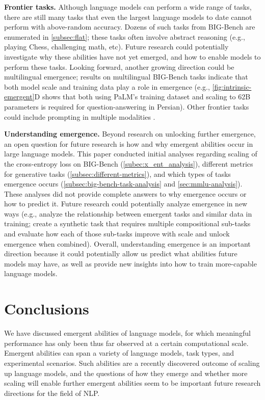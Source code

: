 \documentclass[10pt]{article} %
\begin{document}
\vspace{1mm}
\noindent
\textbf{Frontier tasks.}
Although language models can perform a wide range of tasks, there are still many tasks that even the largest language models to date cannot perform with above-random accuracy.
Dozens of such tasks from BIG-Bench are enumerated in \cref{subsec:flat}; these tasks often involve abstract reasoning (e.g., playing Chess, challenging math, etc). 
Future research could potentially investigate why these abilities have not yet emerged, and how to enable models to perform these tasks.
Looking forward, another growing direction could be multilingual emergence; results on  multilingual BIG-Bench tasks indicate that both model scale and training data play a role in emergence (e.g., \cref{fig:intrinsic-emergent}D shows that both using PaLM's training dataset and scaling to 62B parameters is required for question-answering in Persian).
Other frontier tasks could include prompting in multiple modalities \citep{alayrac2022flamingo,ramesh2022hierarchical}.

\vspace{1mm}
\noindent
\textbf{Understanding emergence.}
Beyond research on unlocking further emergence, an open question for future research is how and why emergent abilities occur in large language models.
This paper conducted initial analyses regarding scaling of the cross-entropy loss on BIG-Bench (\cref{subec:x_ent_analysis}), different metrics for generative tasks (\cref{subsec:different-metrics}), and which types of tasks emergence occurs (\cref{subsec:big-bench-task-analysis} and \cref{sec:mmlu-analysis}).
These analyses did not provide complete answers to why emergence occurs or how to predict it.
Future research could potentially analyze emergence in new ways (e.g., analyze the relationship between emergent tasks and similar data in training; create a synthetic task that requires multiple compositional sub-tasks and evaluate how each of those sub-tasks improve with scale and unlock emergence when combined).
Overall, understanding emergence is an important direction because it could potentially allow us predict what abilities future models may have, as well as provide new insights into how to train more-capable language models.

\section{Conclusions}
We have discussed emergent abilities of language models, for which meaningful performance has only been thus far observed at a certain computational scale.
Emergent abilities can span a variety of language models, task types, and experimental scenarios. 
Such abilities are a recently discovered outcome of scaling up language models, and the questions of how they emerge and whether more scaling will enable further emergent abilities seem to be important future research directions for the field of NLP.
\end{document}
